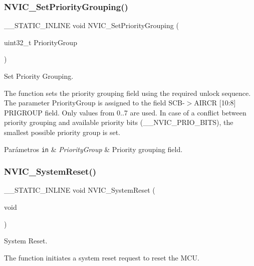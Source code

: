 \subsubsection{\texorpdfstring{N\+V\+I\+C\+\_\+\+Set\+Priority\+Grouping()}{NVIC\_SetPriorityGrouping()}}
{\footnotesize\ttfamily \+\_\+\+\_\+\+S\+T\+A\+T\+I\+C\+\_\+\+I\+N\+L\+I\+NE void N\+V\+I\+C\+\_\+\+Set\+Priority\+Grouping (\begin{DoxyParamCaption}\item[{uint32\+\_\+t}]{Priority\+Group }\end{DoxyParamCaption})}



Set Priority Grouping. 

The function sets the priority grouping field using the required unlock sequence. The parameter Priority\+Group is assigned to the field S\+C\+B-\/$>$A\+I\+R\+CR \mbox{[}10\+:8\mbox{]} P\+R\+I\+G\+R\+O\+UP field. Only values from 0..7 are used. In case of a conflict between priority grouping and available priority bits (\+\_\+\+\_\+\+N\+V\+I\+C\+\_\+\+P\+R\+I\+O\+\_\+\+B\+I\+TS), the smallest possible priority group is set.


\begin{DoxyParams}[1]{Parámetros}
\mbox{\tt in}  & {\em Priority\+Group} & Priority grouping field. \\
\hline
\end{DoxyParams}
\mbox{\label{group___c_m_s_i_s___core___n_v_i_c_functions_ga1143dec48d60a3d6f238c4798a87759c}} 
\subsubsection{\texorpdfstring{N\+V\+I\+C\+\_\+\+System\+Reset()}{NVIC\_SystemReset()}}
{\footnotesize\ttfamily \+\_\+\+\_\+\+S\+T\+A\+T\+I\+C\+\_\+\+I\+N\+L\+I\+NE void N\+V\+I\+C\+\_\+\+System\+Reset (\begin{DoxyParamCaption}\item[{void}]{ }\end{DoxyParamCaption})}



System Reset. 

The function initiates a system reset request to reset the M\+CU. 